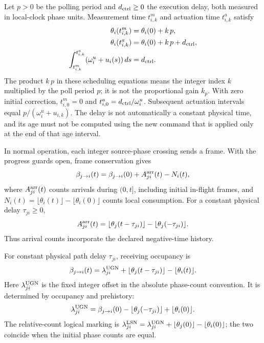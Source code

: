 Let $p>0$ be the polling period and $d_{\rm ctrl}\ge0$ the execution delay,
both measured in local-clock phase units. Measurement time $t^m_{i,k}$
and actuation time $t^a_{i,k}$ satisfy
\begin{align}
 \theta_i(t^m_{i,k})&=\theta_i(0)+k\,p,\nonumber\\
 \theta_i(t^a_{i,k})&=\theta_i(0)+k\,p+d_{\rm ctrl},\nonumber\\
 \int_{t^m_{i,k}}^{t^a_{i,k}}(\omega_i^u+u_i(s))\,ds&=d_{\rm ctrl}.
 \label{eq:fpi_local_schedule}
\end{align}
The product $k\,p$ in these scheduling equations means the integer index
$k$ multiplied by the poll period $p$; it is not the proportional gain
$k_p$. With zero initial correction, $t^m_{i,0}=0$ and
$t^a_{i,0}=d_{\rm ctrl}/\omega_i^u$. Subsequent actuation intervals equal
$p/(\omega_i^u+u_{i,k})$. The delay is not automatically a constant
physical time, and its age must not be computed using the new command
that is applied only at the end of that age interval.

In normal operation, each integer source-phase crossing sends a frame.
With the progress guards open, frame conservation gives
\begin{equation}
 \beta_{j\to i}(t)=\beta_{j\to i}(0)+A^{\rm arr}_{ji}(t)-N_i(t),
 \label{eq:fpi_count_balance}
\end{equation}
where $A^{\rm arr}_{ji}(t)$ counts arrivals during $(0,t]$, including
initial in-flight frames, and
$N_i(t)=\lfloor\theta_i(t)\rfloor-\lfloor\theta_i(0)\rfloor$ counts
local consumption. For a constant physical delay $\tau_{ji}\ge0$,
\begin{equation}
 A^{\rm arr}_{ji}(t)=\lfloor\theta_j(t-\tau_{ji})\rfloor
                  -\lfloor\theta_j(-\tau_{ji})\rfloor.
 \label{eq:fpi_fixed_delay_arrivals}
\end{equation}
Thus arrival counts incorporate the declared negative-time history.

For constant physical path delay $\tau_{ji}$, receiving occupancy is
\begin{equation}
 \beta_{j\to i}(t)=\lambda^{\rm UGN}_{ji}
 +\lfloor\theta_j(t-\tau_{ji})\rfloor-\lfloor\theta_i(t)\rfloor.
 \label{eq:fpd_continuous_fifo}
\end{equation}
Here $\lambda^{\rm UGN}_{ji}$ is the fixed integer offset in the absolute
phase-count convention. It is determined by occupancy and prehistory:
\begin{equation}
 \lambda^{\rm UGN}_{ji}=\beta_{j\to i}(0)
 -\lfloor\theta_j(-\tau_{ji})\rfloor+\lfloor\theta_i(0)\rfloor.
 \label{eq:fpd_ugn_init}
\end{equation}
The relative-count logical marking is
$\lambda^{\rm LSN}_{ji}=\lambda^{\rm UGN}_{ji}
+\lfloor\theta_j(0)\rfloor-\lfloor\theta_i(0)\rfloor$;
the two coincide when the initial phase counts are equal.

